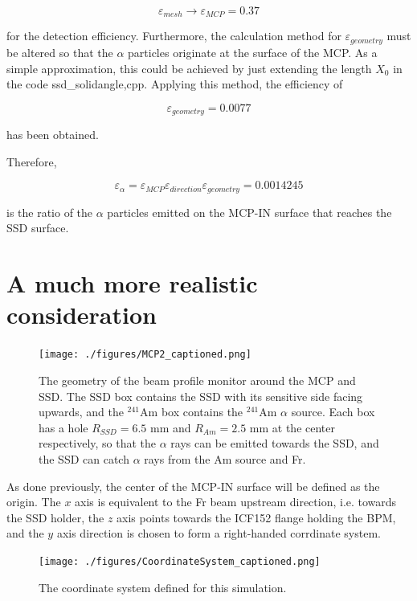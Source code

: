 \documentclass{article}
\begin{document}
$$
\varepsilon_{mesh} \rightarrow \varepsilon_{MCP} = 0.37
$$

for the detection efficiency. Furthermore, the calculation method for $\varepsilon_{geometry}$ must be altered so that the $\alpha$ particles originate at the surface of the MCP. As a simple approximation, this could be achieved by just extending the length $X_0$ in the code ssd\_solidangle,cpp. Applying this method, the efficiency of 

$$
\varepsilon_{geometry} = 0.0077
$$

has been obtained.

Therefore, 

$$
\varepsilon_{\alpha} = \varepsilon_{MCP} \varepsilon_{direction} \varepsilon_{geometry} = 0.0014245
$$

is the ratio of the $\alpha$ particles emitted on the MCP-IN surface that reaches the SSD surface.





\section{A much more realistic consideration}

\begin{figure}[H]
  \begin{center}
    \texttt{[image: ./figures/MCP2\_captioned.png]}
	  \caption{The geometry of the beam profile monitor around the MCP and SSD. The SSD box contains the SSD with its sensitive side facing upwards, and the ${}^{241}$Am box contains the ${}^{241}$Am $\alpha$ source. Each box has a hole $R_{SSD} = 6.5$ mm and $R_{Am} = 2.5$ mm at the center respectively, so that the $\alpha$ rays can be emitted towards the SSD, and the SSD can catch $\alpha$ rays from the Am source and Fr.}
    \label{fig:MCP2_captioned}
  \end{center}
\end{figure}

As done previously, the center of the MCP-IN surface will be defined as the origin. The $x$ axis is equivalent to the Fr beam upstream direction, i.e. towards the SSD holder, the $z$ axis points towards the ICF152 flange holding the BPM, and the $y$ axis direction is chosen to form a right-handed corrdinate system.

\begin{figure}[H]
  \begin{center}
    \texttt{[image: ./figures/CoordinateSystem\_captioned.png]}
	  \caption{The coordinate system defined for this simulation.}
    \label{fig:CoordinateSystem_captioned}
  \end{center}
\end{figure}
\end{document}
